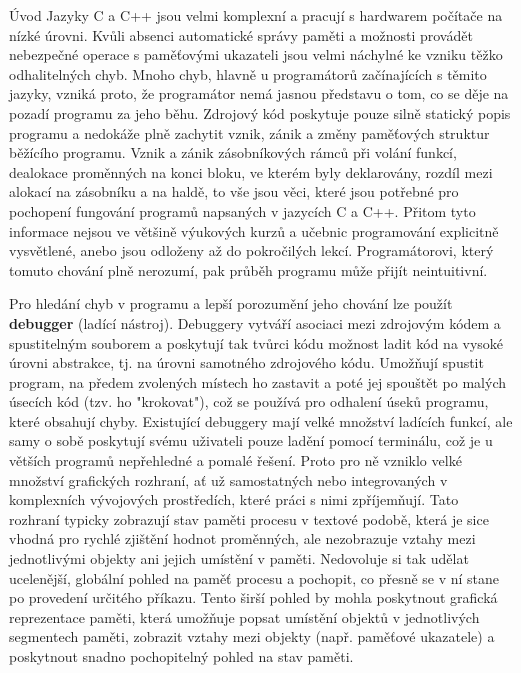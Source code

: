 \documentclass[bc,male,python,dept460]{diploma}						%
\newcommand{\parspace}[1][]{
	\ifthenelse{\isempty{#1}}{\vspace{5mm}}{\vspace{#1}}
	\par
}
\begin{document}
\begin{section}{Úvod}
	Jazyky C a C++ jsou velmi komplexní a pracují s hardwarem počítače na nízké úrovni.
	Kvůli absenci automatické správy paměti a možnosti provádět nebezpečné operace s paměťovými ukazateli jsou velmi náchylné ke vzniku těžko odhalitelných chyb.
	Mnoho chyb, hlavně u programátorů začínajících s těmito jazyky, vzniká proto, že programátor nemá jasnou představu o tom, co se děje na pozadí programu za
	jeho běhu. Zdrojový kód poskytuje pouze silně statický popis programu a nedokáže plně zachytit vznik, zánik a změny paměťových struktur běžícího programu.
	Vznik a zánik zásobníkových rámců při volání funkcí, dealokace proměnných na konci bloku, ve kterém byly deklarovány, rozdíl mezi alokací na zásobníku a na haldě,
	to vše jsou věci, které jsou potřebné pro pochopení fungování programů napsaných v jazycích C a C++. Přitom tyto informace nejsou ve většině výukových kurzů
	a učebnic programování explicitně vysvětlené, anebo jsou odloženy až do pokročilých lekcí. Programátorovi, který tomuto chování plně nerozumí,
	pak průběh programu může přijít neintuitivní.
	
	\parspace Pro hledání chyb v programu a lepší porozumění jeho chování lze použít \textbf{debugger} (ladící nástroj).
	Debuggery vytváří asociaci mezi zdrojovým kódem a spustitelným souborem a poskytují tak tvůrci kódu možnost ladit kód
	na vysoké úrovni abstrakce, tj. na úrovni samotného zdrojového kódu. Umožňují spustit program, na předem zvolených místech ho zastavit a poté jej spouštět
	po malých úsecích kód (tzv. ho "krokovat"), což se používá pro odhalení úseků programu, které obsahují chyby. Existující debuggery mají velké množství
	ladících funkcí, ale samy o sobě poskytují svému uživateli pouze ladění pomocí terminálu, což je u větších programů
	nepřehledné a pomalé řešení. Proto pro ně vzniklo velké množství grafických rozhraní, ať už samostatných nebo integrovaných v komplexních vývojových prostředích,
	které práci s nimi zpříjemňují. Tato rozhraní typicky zobrazují stav paměti procesu v textové podobě, která je sice vhodná pro rychlé
	zjištění hodnot proměnných, ale nezobrazuje vztahy mezi jednotlivými objekty ani jejich umístění v paměti.
	Nedovoluje si tak udělat ucelenější, globální pohled na paměť procesu a pochopit, co přesně se v ní stane po provedení určitého příkazu.
	Tento širší pohled by mohla poskytnout grafická reprezentace paměti, která umožňuje popsat umístění objektů v jednotlivých segmentech paměti,
	zobrazit vztahy mezi objekty (např. paměťové ukazatele) a poskytnout snadno pochopitelný pohled na stav paměti.
	

\end{section}
\end{document}

